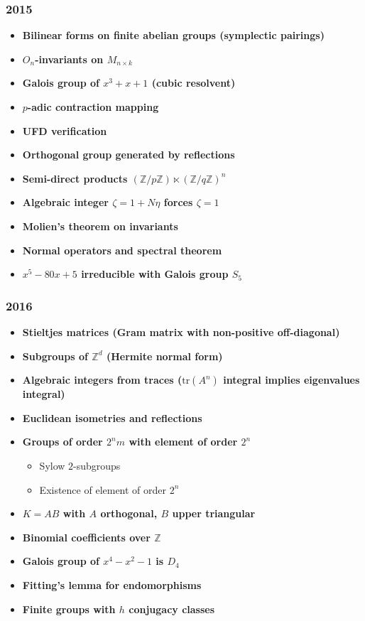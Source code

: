 \subsubsection*{2015}
\begin{itemize}
    \item \textbf{Bilinear forms on finite abelian groups (symplectic pairings)}
    \item \textbf{$O_n$-invariants on $M_{n \times k}$}
    \item \textbf{Galois group of $x^3+x+1$ (cubic resolvent)}
    \item \textbf{$p$-adic contraction mapping}
    \item \textbf{UFD verification}
    \item \textbf{Orthogonal group generated by reflections}
    \item \textbf{Semi-direct products $(\mathbb{Z}/p\mathbb{Z}) \ltimes (\mathbb{Z}/q\mathbb{Z})^n$}
    \item \textbf{Algebraic integer $\zeta = 1 + N\eta$ forces $\zeta=1$}
    \item \textbf{Molien's theorem on invariants}
    \item \textbf{Normal operators and spectral theorem}
    \item \textbf{$x^5-80x+5$ irreducible with Galois group $S_5$}
\end{itemize}

\subsubsection*{2016}
\begin{itemize}
    \item \textbf{Stieltjes matrices (Gram matrix with non-positive off-diagonal)}
    \item \textbf{Subgroups of $\mathbb{Z}^d$ (Hermite normal form)}
    \item \textbf{Algebraic integers from traces ($\mathrm{tr}(A^n)$ integral implies eigenvalues integral)}
    \item \textbf{Euclidean isometries and reflections}
    \item \textbf{Groups of order $2^n m$ with element of order $2^n$}
        \begin{itemize}
            \item Sylow $2$-subgroups
            \item Existence of element of order $2^n$
        \end{itemize}
    \item \textbf{$K=AB$ with $A$ orthogonal, $B$ upper triangular}
    \item \textbf{Binomial coefficients over $\mathbb{Z}$}
    \item \textbf{Galois group of $x^4-x^2-1$ is $D_4$}
    \item \textbf{Fitting's lemma for endomorphisms}
    \item \textbf{Finite groups with $h$ conjugacy classes}
\end{itemize}

